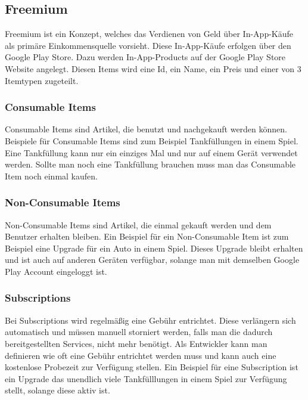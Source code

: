 \documentclass[FIPLY_base.tex]{subfiles}
\begin{document}
\subsection{Freemium}
Freemium ist ein Konzept, welches das Verdienen von Geld über In-App-Käufe als primäre Einkommensquelle vorsieht.
Diese In-App-Käufe erfolgen über den Google Play Store. 
Dazu werden In-App-Products auf der Google Play Store Website angelegt.
Diesen Items wird eine Id, ein Name, ein Preis und einer von 3 Itemtypen zugeteilt. 

\subsubsection{Consumable Items}
Consumable Items sind Artikel, die benutzt und nachgekauft werden können. 
Beispiele für Consumable Items sind zum Beispiel Tankfüllungen in einem Spiel.
Eine Tankfüllung kann nur ein einziges Mal und nur auf einem Gerät verwendet werden. Sollte man noch eine Tankfüllung brauchen muss man das Consumable Item noch einmal kaufen. 

\subsubsection{Non-Consumable Items} 
Non-Consumable Items sind Artikel, die einmal gekauft werden und dem Benutzer erhalten bleiben.
Ein Beispiel für ein Non-Consumable Item ist zum Beispiel eine Upgrade für ein Auto in einem Spiel.
Dieses Upgrade bleibt erhalten und ist auch auf anderen Geräten verfügbar, solange man mit demselben Google Play Account eingeloggt ist. 

\subsubsection{Subscriptions}
Bei Subscriptions wird regelmäßig eine Gebühr entrichtet.
Diese verlängern sich automatisch und müssen manuell storniert werden, falls man die dadurch bereitgestellten Services, nicht mehr benötigt.
Als Entwickler kann man definieren wie oft eine Gebühr entrichtet werden muss und kann auch eine kostenlose Probezeit zur Verfügung stellen. 
Ein Beispiel für eine Subscription ist ein Upgrade das unendlich viele Tankfülllungen in einem Spiel zur Verfügung stellt, solange diese aktiv ist.
\end{document}
